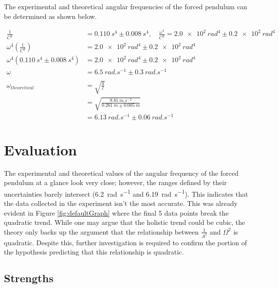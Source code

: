 \documentclass[letterpaper, 12pt]{article}
\begin{document}
The experimental and theoretical angular frequencies of the forced pendulum can be
determined as shown below.

\begin{align*}
    \frac{1}{C^2}                                  & = \SI{0.110}{s^4} \pm \SI{0.008}{s^4},\quad \frac{\omega^4}{C^2} = \SI{2.0e2}{rad^4} \pm \SI{0.2e2}{rad^4}
    \\
    \omega^4 \left( \frac{1}{C^2} \right)          & = \SI{2.0e2}{rad^4} \pm \SI{0.2e2}{rad^4}
    \\
    \omega^4 (\SI{0.110}{s^4} \pm \SI{0.008}{s^4}) & = \SI{2.0e2}{rad^4} \pm \SI{0.2e2}{rad^4}
    \\
    \omega                                         & = \SI{6.5}{rad.s^{-1}} \pm \SI{0.3}{rad.s^{-1}}
    \\
    \\
    \omega_{theoretical}                           & = \sqrt{\frac{g}{l}}
    \\
                                                   & = \sqrt{\frac{\SI{9.81}{m.s^{-2}}}{\SI{0.261}{m} \pm \SI{0.005}{m}}}
    \\
                                                   & = \SI{6.13}{rad.s^{-1}} \pm \SI{0.06}{rad.s^{-1}}
\end{align*}

\section{Evaluation}

The experimental and theoretical values of the
angular frequency of the forced pendulum at a glance
look very close; however, the ranges defined by their
uncertainties barely intersect (\SI{6.2}{rad.s^{-1}} and \SI{6.19}{rad.s^{-1}}). This indicates that
the data collected in the experiment isn't the most accurate.
This was already evident in Figure \ref*{fig:defaultGraph} where
the final 5 data points break the quadratic trend.
While one may argue that the holistic trend
could be cubic, the theory only backs up the argument
that the relationship between \(\frac{1}{A^2}\) and \(\Omega^2\)
is quadratic. Despite this, further investigation
is required to confirm the portion of the hypothesis
predicting that this relationship is quadratic.

\subsection{Strengths}
\end{document}

